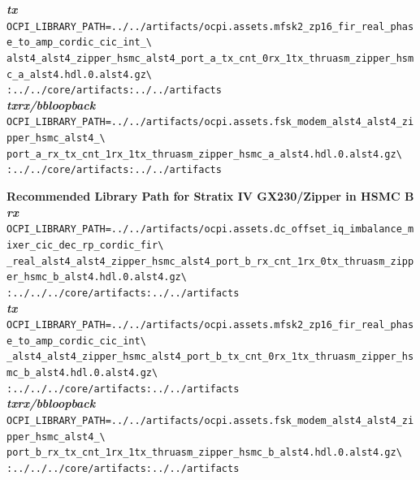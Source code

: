 \begin{appendices}
\textbf{\textit{tx}}\\
\verb|OCPI_LIBRARY_PATH=../../artifacts/ocpi.assets.mfsk2_zp16_fir_real_phase_to_amp_cordic_cic_int_\| \\
\verb|alst4_alst4_zipper_hsmc_alst4_port_a_tx_cnt_0rx_1tx_thruasm_zipper_hsmc_a_alst4.hdl.0.alst4.gz\| \\
\verb|:../../core/artifacts:../../artifacts| \\

\textbf{\textit{txrx/bbloopback}}\\
\verb|OCPI_LIBRARY_PATH=../../artifacts/ocpi.assets.fsk_modem_alst4_alst4_zipper_hsmc_alst4_\| \\
\verb|port_a_rx_tx_cnt_1rx_1tx_thruasm_zipper_hsmc_a_alst4.hdl.0.alst4.gz\| \\
\verb|:../../core/artifacts:../../artifacts| \\
\par\medskip

\textbf{Recommended Library Path for Stratix IV GX230/Zipper in HSMC B}\\

\textbf{\textit{rx}}\\
\verb|OCPI_LIBRARY_PATH=../../artifacts/ocpi.assets.dc_offset_iq_imbalance_mixer_cic_dec_rp_cordic_fir\| \\
\verb|_real_alst4_alst4_zipper_hsmc_alst4_port_b_rx_cnt_1rx_0tx_thruasm_zipper_hsmc_b_alst4.hdl.0.alst4.gz\| \\
\verb|:../../../core/artifacts:../../artifacts| \\

\textbf{\textit{tx}}\\
\verb|OCPI_LIBRARY_PATH=../../artifacts/ocpi.assets.mfsk2_zp16_fir_real_phase_to_amp_cordic_cic_int\| \\
\verb|_alst4_alst4_zipper_hsmc_alst4_port_b_tx_cnt_0rx_1tx_thruasm_zipper_hsmc_b_alst4.hdl.0.alst4.gz\| \\
\verb|:../../../core/artifacts:../../artifacts| \\

\textbf{\textit{txrx/bbloopback}}\\
\verb|OCPI_LIBRARY_PATH=../../artifacts/ocpi.assets.fsk_modem_alst4_alst4_zipper_hsmc_alst4_\| \\
\verb|port_b_rx_tx_cnt_1rx_1tx_thruasm_zipper_hsmc_b_alst4.hdl.0.alst4.gz\| \\
\verb|:../../../core/artifacts:../../artifacts| \\
\par\medskip



\end{appendices}
